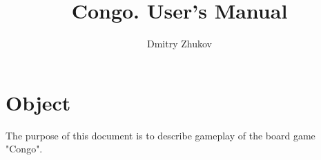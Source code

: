 \documentclass[a4paper, 11pt]{article}
\begin{document}
\title{Congo. User's Manual}
\author{Dmitry Zhukov}

\maketitle

\tableofcontents

\newpage

\section{Object}

The purpose of this document is to describe gameplay of the board game "Congo".








\end{document}
